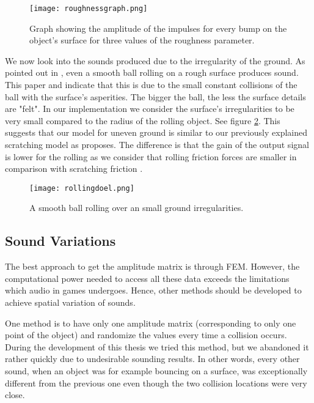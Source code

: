 \begin{figure}[H]
  \centering
    \texttt{[image: roughnessgraph.png]}
      \caption{Graph showing the amplitude of the impulses for every bump on the object's surface for three values of the roughness parameter.}
      \label{fig:roughnessgraph}
\end{figure} 

We now look into the sounds produced due to the irregularity of the ground. As pointed out in \cite{van2001foleyautomatic}, even a smooth ball rolling on a rough surface produces sound. This paper and \cite{rath2003expressive} indicate that this is due to the small constant collisions of the ball with the surface's asperities. The bigger the ball, the less the surface details are "felt". In our implementation we consider the surface's irregularities to be very small compared to the radius of the rolling object. See figure \ref{fig:rollingdoel}. This suggests that our model for uneven ground is similar to our previously explained scratching model as \cite{van2001foleyautomatic} proposes. The difference is that the gain of the output signal is lower for the rolling as we consider that rolling friction forces are smaller in comparison with scratching friction \cite{mehtas}.

\begin{figure}[H]
  \centering
    \texttt{[image: rollingdoel.png]}
      \caption{A smooth ball rolling over an small ground irregularities.}
      \label{fig:rollingdoel}
\end{figure} 

\subsection{Sound Variations}
The best approach to get the amplitude matrix is through FEM. However, the computational power needed to access all these data exceeds the limitations which audio in games undergoes. Hence, other methods should be developed to achieve spatial variation of sounds. 

One method is to have only one amplitude matrix (corresponding to only one point of the object) and randomize the values every time a collision occurs. During the development of this thesis we tried this method, but we abandoned it rather quickly due to undesirable sounding results. In other words, every other sound, when an object was for example bouncing on a surface, was exceptionally different from the previous one even though the two collision locations were very close.

